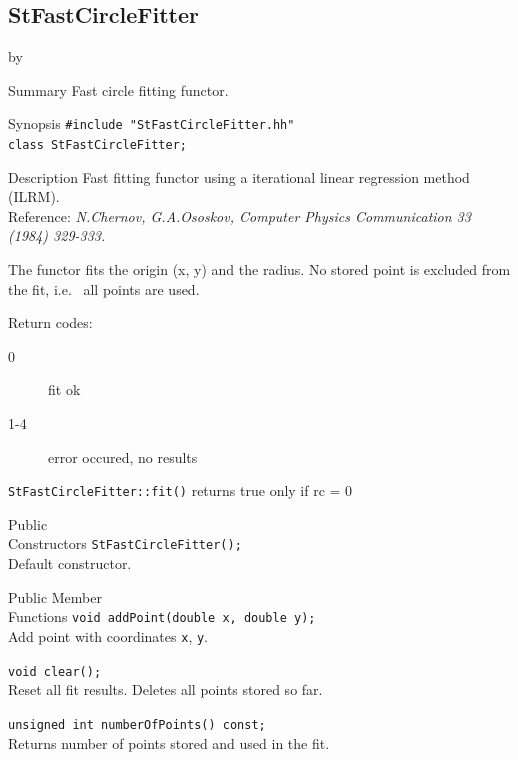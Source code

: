 \documentclass[twoside]{article}
\newcommand{\entrylabel}[1]{\mbox{\textbf{{#1}}}\hfil}%
\newenvironment{entry}
{\begin{list}{}%
    {\renewcommand{\makelabel}{\entrylabel}%
     \setlength{\labelwidth}{90pt}%
     \setlength{\leftmargin}{\labelwidth}
     \advance\leftmargin by \labelsep%
      }%
    }%
  {\end{list}}
\newcommand{\Entrylabel}[1]%
{\raisebox{0pt}[1ex][0pt]{\makebox[\labelwidth][l]%
    {\parbox[t]{\labelwidth}{\hspace{0pt}\textbf{{#1}}}}}}
\newenvironment{Entry}%
{\renewcommand{\entrylabel}{\Entrylabel}\begin{entry}}%
  {\end{entry}}
\begin{document}
\begin{description}
%
%
\subsection{StFastCircleFitter } \label{StFastCircleFitter}
\begin{Entry}
\item[Summary]
     Fast circle fitting functor.
     
\item[Synopsis]
  \verb+#include "StFastCircleFitter.hh"+ \\
  \verb+class StFastCircleFitter;+
  
    
\item[Description]   
  Fast fitting functor using a iterational linear regression 
  method (ILRM).\\
  Reference: \textit{N.Chernov, G.A.Ososkov, Computer  
  Physics Communication 33 (1984) 329-333.}              

  The functor fits the origin (x, y) and the radius. No stored
  point is excluded from the fit, i.e.~ all points are used.
  
  Return codes:
  \begin{description}
      \item[0]    fit ok 
      \item[1-4]  error occured, no results
  \end{description}
  \texttt{StFastCircleFitter::fit()} returns true only if rc = 0

\item[Public\\ Constructors]
    \verb+StFastCircleFitter();+\\
    Default constructor. 
    
\item[Public Member\\ Functions]
    \verb+void addPoint(double x, double y);+\\
    Add point with coordinates \texttt{x}, \texttt{y}.

    \verb+void clear();+\\
    Reset all fit results. Deletes all points stored so far.

    \verb+unsigned int numberOfPoints() const;+\\
    Returns number of points stored and used in the fit.
    

\end{Entry}
\end{description}
\end{document}
